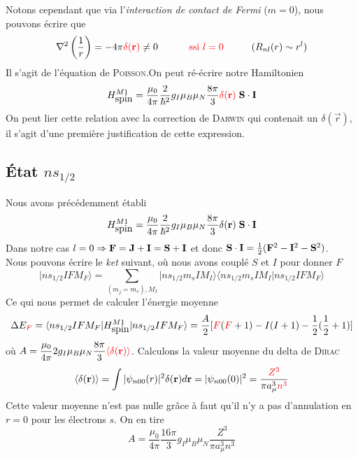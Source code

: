 Notons cependant que via l'\textit{interaction de contact de Fermi} ($m=0$), nous pouvons écrire
que
\begin{equation}
\nabla^2 \left( \frac{1}{r} \right)  
= -4 \pi {\color{red} \delta ({\bf r})  } \neq 0 
\hspace*{1cm}
{\color{red} ~\mbox{ssi}~l=0  }
\hspace*{1cm} (R_{nl} (r) \sim r^l )
\end{equation}
Il s'agit de l'équation de \textsc{Poisson}.On peut ré-écrire notre Hamiltonien
\begin{equation}
H^{M1}_{\mbox{spin}}  =  
\frac{\mu_0}{4 \pi} \frac{2}{\hbar^2} 
g_I \mu_B \mu_N 
\frac{8 \pi}{3} 
{\color{red}  \delta( {\bf r})}
\;  {\bf S} \cdot {\bf I}
\end{equation}
On peut lier cette relation avec la correction de \textsc{Darwin} qui contenait un $\delta(\vec{r})$,
il s'agit d'une première justification de cette expression.


\subsection{État $ns_{1/2}$}
Nous avons précédemment établi 
\begin{equation}
H^{M1}_{\mbox{spin}}  =  \frac{\mu_0}{4 \pi} \frac{2}{\hbar^2} g_I \mu_B \mu_N \frac{8 \pi}{3} \delta( {\bf r})
\;  {\bf S} \cdot {\bf I}
\end{equation}
Dans notre cas $l = 0 \Rightarrow {\bf F} = {\bf J} + {\bf I} =  {\bf S} + {\bf I}$ et donc 
${\bf S} \cdot {\bf I} = \frac{1}{2} ({\bf F}^2 - {\bf I}^2 - {\bf S}^2)$.\\

Nous pouvons écrire le \textit{ket} suivant, où nous avons couplé $S$ et $I$ pour donner $F$
\begin{equation}
\vert ns_{1/2}IFM_F \rangle=  \sum_{(m_j=m_s),M_I}
\vert ns_{1/2}m_s I M_I \rangle 
\langle ns_{1/2}m_s I M_I 
\vert ns_{1/2}IFM_F \rangle  
\end{equation}
Ce qui nous permet de calculer l'énergie moyenne
\begin{equation}
\Delta E_{\color{red} F} = \langle ns_{1/2}IFM_F \vert H^{M1}_{\mbox{spin}}
\vert ns_{1/2}IFM_F \rangle  = \frac{A}{2} [ {\color{red} F}({\color{red} F}+1) 
- I(I+1) - \frac{1}{2}(\frac{1}{2}+1)]
\end{equation}
où $\displaystyle A =
\frac{\mu_0}{4 \pi} 2  
g_I \mu_B \mu_N \frac{8 \pi}{3} 
 {\color{red} \langle \delta( {\bf r})  \rangle }$. Calculons la valeur moyenne du delta de
\textsc{Dirac}
\begin{equation}
\langle \delta( {\bf r}) \rangle = \int \vert \psi_{n00} (r) \vert^2
\delta( {\bf r} ) d{\bf r} = \vert \psi_{n00} (0) \vert^2 = 
\frac{{\color{red} Z^3}}{\pi a_\mu^3 {\color{red} n^3}}
\end{equation}
Cette valeur moyenne n'est pas nulle grâce à faut qu'il n'y a pas d'annulation en $r=0$ pour les
électrons $s$. On en tire
\begin{equation}
A =
\frac{\mu_0}{4 \pi}  \frac{16 \pi}{3} g_I \mu_B \mu_N  
\frac{Z^3}{\pi a_\mu^3 n^3}
\end{equation}


